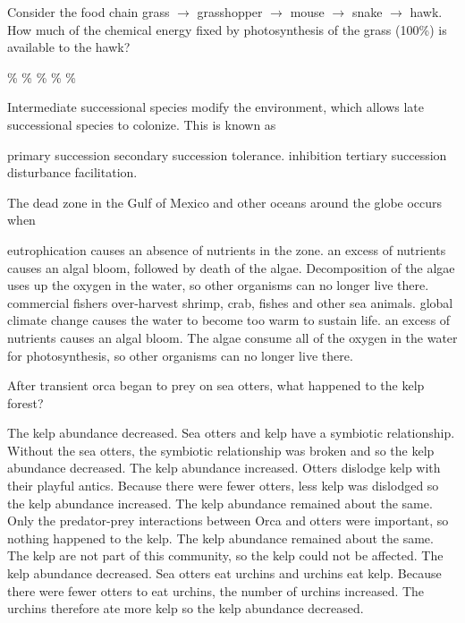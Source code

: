 \question
Consider the food chain grass $\to$ grasshopper $\to$ mouse $\to$ snake $\to$ hawk. How much of the chemical energy fixed by photosynthesis of the grass (100\%) is available to the hawk?

\begin{choices}
\%
\% %
\% %
\% %
\% %
\end{choices}


\question
Intermediate successional species modify the environment, which allows late successional species to colonize. This is known as

\begin{choices}
\choice primary succession 
\choice secondary succession 
\choice tolerance. 
\choice inhibition 
\choice tertiary succession 
\choice disturbance 
\correctchoice facilitation. 
\end{choices}

\question
The dead zone in the Gulf of Mexico and other oceans around the globe occurs when

\begin{choices}
\choice eutrophication causes an absence of nutrients in the zone.
\correctchoice an excess of nutrients causes an algal bloom, followed by death of the algae. Decomposition of the algae uses up the oxygen in the water, so other organisms can no longer live there.
\choice commercial fishers over-harvest shrimp, crab, fishes and other sea animals.
\choice global climate change causes the water to become too warm to sustain life.
\choice an excess of nutrients causes an algal bloom. The algae consume all of the oxygen in the water for photosynthesis, so other organisms can no longer live there.
\end{choices}

\question
After transient orca began to prey on sea otters, what happened to the kelp forest?

\begin{choices}
\choice The kelp abundance decreased. Sea otters and kelp have a symbiotic relationship. Without the sea otters, the symbiotic relationship was broken and so the kelp abundance decreased.
\choice The kelp abundance increased. Otters dislodge kelp with their playful antics.  Because there were fewer otters, less kelp was dislodged so the kelp abundance increased.
\choice The kelp abundance remained about the same. Only the predator-prey interactions between Orca and otters were important, so nothing happened to the kelp.
\choice The kelp abundance remained about the same. The kelp are not part of this community, so the kelp could not be affected.
\correctchoice The kelp abundance decreased. Sea otters eat urchins and urchins eat kelp.  Because there were fewer otters to eat urchins, the number of urchins increased.  The urchins therefore ate more kelp so the kelp abundance decreased.
\end{choices}

